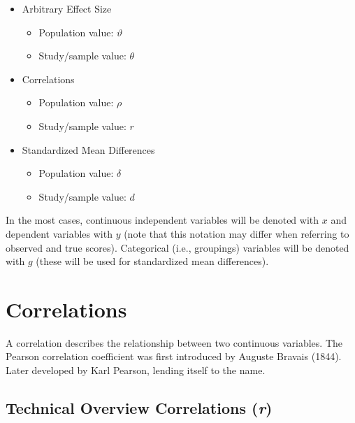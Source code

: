 \documentclass[
  letterpaper,
  DIV=11,
  numbers=noendperiod]{scrreprt}
\providecommand{\tightlist}{%
  \setlength{\itemsep}{0pt}\setlength{\parskip}{0pt}}\usepackage{longtable,booktabs,array}
\begin{document}
\begin{itemize}
\tightlist
\item
  Arbitrary Effect Size

  \begin{itemize}
  \tightlist
  \item
    Population value: \(\vartheta\)
  \item
    Study/sample value: \(\theta\)
  \end{itemize}
\item
  Correlations

  \begin{itemize}
  \tightlist
  \item
    Population value: \(\rho\)
  \item
    Study/sample value: \(r\)
  \end{itemize}
\item
  Standardized Mean Differences

  \begin{itemize}
  \tightlist
  \item
    Population value: \(\delta\)
  \item
    Study/sample value: \(d\)
  \end{itemize}
\end{itemize}

In the most cases, continuous independent variables will be denoted with
\(x\) and dependent variables with \(y\) (note that this notation may
differ when referring to observed and true scores). Categorical (i.e.,
groupings) variables will be denoted with \(g\) (these will be used for
standardized mean differences).

\hypertarget{correlations}{%
\section{Correlations}\label{correlations}}

A correlation describes the relationship between two continuous
variables. The Pearson correlation coefficient was first introduced by
Auguste Bravais (1844). Later developed by Karl Pearson, lending itself
to the name.

\hypertarget{technical-overview-correlations-r}{%
\subsection{\texorpdfstring{Technical Overview Correlations
(\emph{r})}{Technical Overview Correlations (r)}}\label{technical-overview-correlations-r}}
\end{document}
